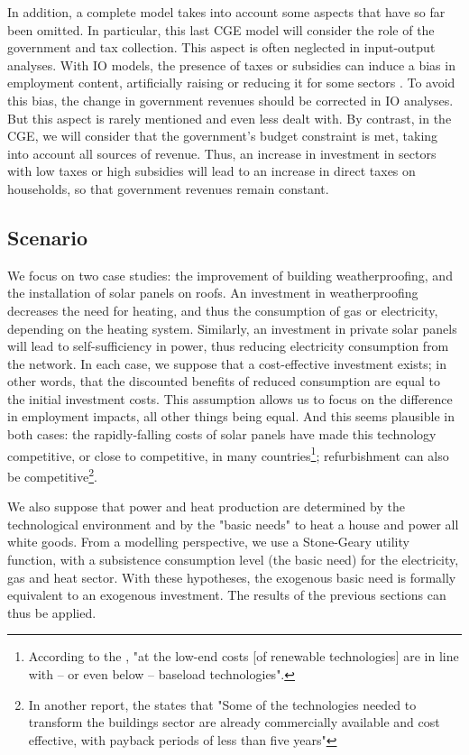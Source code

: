 In addition, a complete model takes into account some aspects that have so far been omitted. In particular, this last CGE model will consider the role of the government and tax collection. This aspect is often neglected in input-output analyses. With IO models, the presence of taxes or subsidies can induce a bias in employment content, artificially raising or reducing it for some sectors \citep{Perrier2017}.
To avoid this bias, the change in government revenues should be corrected in IO analyses. But this aspect is rarely mentioned and even less dealt with.
By contrast, in the CGE, we will consider that the government's budget constraint is met, taking into account all sources of revenue. 
Thus, an increase in investment in sectors with low taxes or high subsidies will lead to an increase in direct taxes on households, so that government revenues remain constant.


\subsection{Scenario}
We focus on two case studies: the improvement of building weatherproofing, and the installation of solar panels on roofs. 
An investment in weatherproofing decreases the need for heating, and thus the consumption of gas or electricity, depending on the heating system. Similarly, an investment in private solar panels will lead to self-sufficiency in power, thus reducing electricity consumption from the network. 
In each case, we suppose that a cost-effective investment exists; in other words, that the discounted benefits of reduced consumption are equal to the initial investment costs. This assumption allows us to focus on the difference in employment impacts, all other things being equal. And this seems plausible in both cases: the rapidly-falling costs of solar panels have made this technology competitive, or close to competitive, in many countries\footnote{According to the \citet{InternationalEnergyAgency2015}, "at the low-end costs [of renewable technologies] are in line with – or even below – baseload technologies".}; refurbishment can also be competitive\footnote{In another report, the \citet{InternationalEnergyAgency2013} states that "Some of the technologies needed to transform the buildings sector are already commercially available and cost effective, with payback periods of less than five years"}.

We also suppose that power and heat production are determined by the technological environment and by the "basic needs" to heat a house and power all white goods. From a modelling perspective, we use a Stone-Geary utility function, with a subsistence consumption level (the basic need) for the electricity, gas and heat sector.
With these hypotheses, the exogenous basic need is formally equivalent to an exogenous investment. The results of the previous sections can thus be applied.

